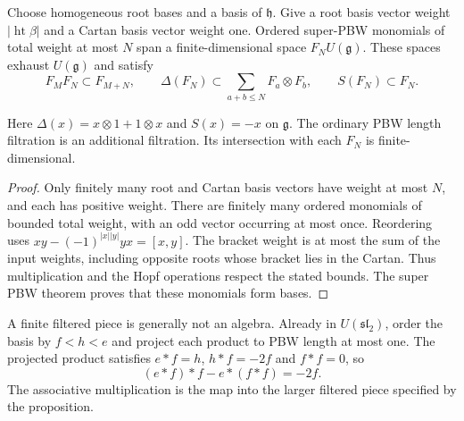 \begin{proposition}
\label{prop:bkm-finite-filtered-pbw}
Choose homogeneous root bases and a basis of $\mathfrak h$.
Give a root basis vector weight $|\operatorname{ht}\beta|$ and a
Cartan basis vector weight one. Ordered super-PBW monomials of total
weight at most $N$ span a finite-dimensional space $F_NU(\mathfrak g)$.
These spaces exhaust $U(\mathfrak g)$ and satisfy
\[
 F_MF_N\subset F_{M+N},\qquad
 \Delta(F_N)\subset\sum_{a+b\leq N}F_a\otimes F_b,\qquad
 S(F_N)\subset F_N.
\]

Here $\Delta(x)=x\otimes1+1\otimes x$ and $S(x)=-x$ on
$\mathfrak g$. The ordinary PBW length filtration is an additional
filtration. Its intersection with each $F_N$ is finite-dimensional.
\end{proposition}
\begin{proof}
Only finitely many root and Cartan basis vectors have weight at
most $N$, and each has positive weight. There are finitely many
ordered monomials of bounded total weight, with an odd vector
occurring at most once. Reordering uses
$xy-(-1)^{|x||y|}yx=[x,y]$. The bracket weight is at most the sum
of the input weights, including opposite roots whose bracket lies
in the Cartan. Thus multiplication and the Hopf operations respect
the stated bounds. The super PBW theorem proves that these
monomials form bases.
\end{proof}

A finite filtered piece is generally not an algebra. Already in
$U(\mathfrak{sl}_2)$, order the basis by $f<h<e$ and project each
product to PBW length at most one. The projected product satisfies
$e*f=h$, $h*f=-2f$ and $f*f=0$, so
\[
 (e*f)*f-e*(f*f)=-2f.
\]
The associative multiplication is the map into the larger filtered
piece specified by the proposition.

